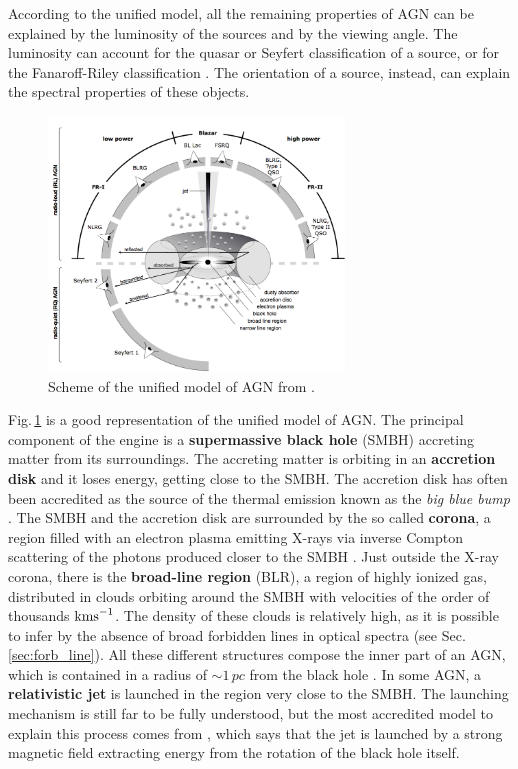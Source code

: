 \documentclass[../thesis.tex]{subfiles}
\begin{document}
According to the unified model, all the remaining properties of AGN can be explained by the luminosity of the sources and by the viewing angle.
The luminosity can account for the quasar or Seyfert classification of a source, or for the Fanaroff-Riley classification \citep{Fanaroff74}.
The orientation of a source, instead, can explain the spectral properties of these objects.

\begin{figure}
\centering
\includegraphics[width=0.7\textwidth]{images/AGNmodel.png} 
\caption[]{Scheme of the unified model of AGN from \citet{Beckmann12}. }
\label{fig:unified_model}
\end{figure}

Fig.\,\ref{fig:unified_model} is a good representation of the unified model of AGN.
The principal component of the engine is a \textbf{supermassive black hole} (SMBH) accreting matter from its surroundings.
The accreting matter is orbiting in an \textbf{accretion disk} and it loses energy, getting close to the SMBH.
The accretion disk has often been accredited as the source of the thermal emission known as the \emph{big blue bump} \citep[e.g.][]{Shang05}.
The SMBH and the accretion disk are surrounded by the so called \textbf{corona}, a region filled with an electron plasma emitting X-rays via inverse Compton scattering of the photons produced closer to the SMBH \citep{Haardt91}.
Just outside the X-ray corona, there is the \textbf{broad-line region} (BLR), a region of highly ionized gas, distributed in clouds orbiting around the SMBH with velocities of the order of thousands $\si{\kms}$. 
The density of these clouds is relatively high, as it is possible to infer by the absence of broad forbidden lines in optical spectra (see Sec.\,\ref{sec:forb_line}).
All these different structures compose the inner part of an AGN, which is contained in a radius of $\sim 1\,\si{pc}$ from the black hole \citep{Beckmann12}.
In some AGN, a \textbf{relativistic jet} is launched in the region very close to the SMBH. 
The launching mechanism is still far to be fully understood, but the most accredited model to explain this process comes from \citet{Blandford77}, which says that the jet is launched by a strong magnetic field extracting energy from the rotation of the black hole itself.
\end{document}
